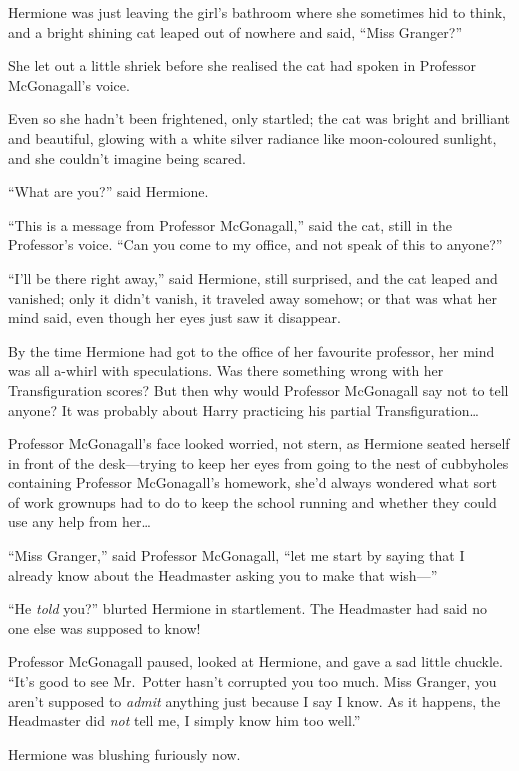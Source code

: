 Hermione was just leaving the girl's bathroom where she sometimes hid to
think, and a bright shining cat leaped out of nowhere and said, ``Miss
Granger?''

She let out a little shriek before she realised the cat had spoken in
Professor McGonagall's voice.

Even so she hadn't been frightened, only startled; the cat was bright
and brilliant and beautiful, glowing with a white silver radiance like
moon-coloured sunlight, and she couldn't imagine being scared.

``What are you?'' said Hermione.

``This is a message from Professor McGonagall,'' said the cat, still in
the Professor's voice. ``Can you come to my office, and not speak of
this to anyone?''

``I'll be there right away,'' said Hermione, still surprised, and the
cat leaped and vanished; only it didn't vanish, it traveled away
somehow; or that was what her mind said, even though her eyes just saw
it disappear.

By the time Hermione had got to the office of her favourite professor,
her mind was all a-whirl with speculations. Was there something wrong
with her Transfiguration scores? But then why would Professor McGonagall
say not to tell anyone? It was probably about Harry practicing his
partial Transfiguration\ldots{}

Professor McGonagall's face looked worried, not stern, as Hermione
seated herself in front of the desk---trying to keep her eyes from going
to the nest of cubbyholes containing Professor McGonagall's homework,
she'd always wondered what sort of work grownups had to do to keep the
school running and whether they could use any help from her\ldots{}

``Miss Granger,'' said Professor McGonagall, ``let me start by saying
that I already know about the Headmaster asking you to make that
wish---''

``He \emph{told} you?'' blurted Hermione in startlement. The Headmaster
had said no one else was supposed to know!

Professor McGonagall paused, looked at Hermione, and gave a sad little
chuckle. ``It's good to see Mr.~Potter hasn't corrupted you too much.
Miss Granger, you aren't supposed to \emph{admit} anything just because
I say I know. As it happens, the Headmaster did \emph{not} tell me, I
simply know him too well.''

Hermione was blushing furiously now.

